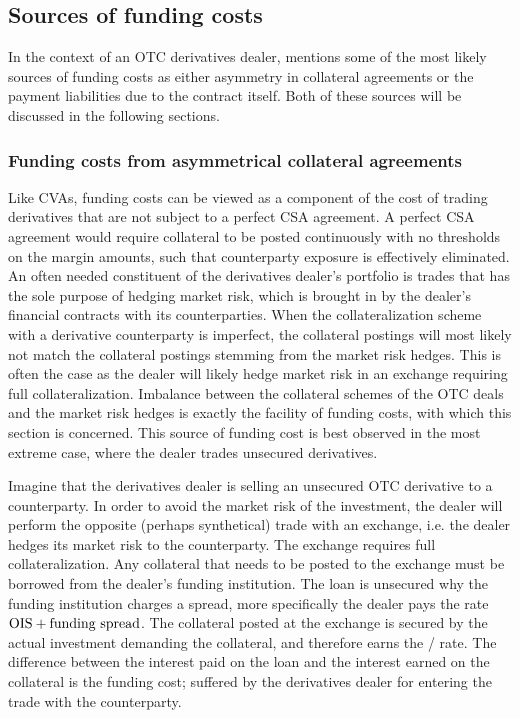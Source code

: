 \documentclass[../../../main.tex]{subfiles}
\begin{document}
    \subsection{Sources of funding costs}
        In the context of an OTC derivatives dealer, 
        \cite{Ruiz2013FVA} mentions some of the most likely sources of funding costs as
        either asymmetry in collateral agreements or the payment liabilities due to the contract itself.
        Both of these sources will be discussed in the following sections.

    \subsubsection{Funding costs from asymmetrical collateral agreements}
        Like CVAs, funding costs can be viewed as a component of the cost of trading derivatives
        that are not subject to a perfect CSA agreement.
        A perfect CSA agreement would require collateral to be posted continuously with no thresholds on the margin amounts,
        such that counterparty exposure is effectively eliminated.
        An often needed constituent of the derivatives dealer's portfolio
        is trades that has the sole purpose of hedging market risk,
        which is brought in by the dealer's financial contracts with its counterparties.
        When the collateralization scheme with a derivative counterparty is imperfect, 
        the collateral postings will most likely not match the collateral postings stemming from the market risk hedges.
        This is often the case as the dealer will likely hedge market risk in an exchange requiring full collateralization.
        Imbalance between the collateral schemes of the OTC deals and the market risk hedges
        is exactly the facility of funding costs, with which this section is concerned.
        This source of funding cost is best observed in the most extreme case, where the dealer trades unsecured derivatives. 

        Imagine that the derivatives dealer is selling an unsecured OTC derivative to a counterparty.
        In order to avoid the market risk of the investment, 
        the dealer will perform the opposite (perhaps synthetical) trade with an exchange,
        i.e. the dealer hedges its market risk to the counterparty.
        The exchange requires full collateralization.
        Any collateral that needs to be posted to the exchange must be borrowed from the dealer's funding institution.
        The loan is unsecured why the funding institution charges a spread,
        more specifically the dealer pays the rate $\OIS/ + \text{funding spread}$.
        The collateral posted at the exchange is secured by the actual investment demanding the collateral,
        and therefore earns the \OIS/ rate.
        The difference between the interest paid on the loan and the interest earned on the collateral is the funding cost;
        suffered by the derivatives dealer for entering the trade with the counterparty. 
\end{document}
